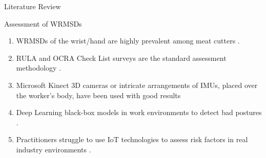 \begin{frame}{Literature Review}
    \begin{alertblock}{Assessment of WRMSDs}
    \begin{enumerate}%
    \item WRMSDs of the wrist/hand are highly prevalent among meat cutters \cite{ViikariJuntura1983}.
    \item RULA and OCRA Check List surveys are the standard assessment methodology \cite{McAtamney1993, Occhipinti1998}.
    \item Microsoft Kinect 3D cameras or intricate arrangements of IMUs, placed over the worker's body, have been used with good results \cite{Vignais2013,Buisseret2018, Chen2018}
    \item Deep Learning black-box models in work environments to detect bad postures \cite{Barkallah2017,Abobakr2017,Hu2018}.
    \item Practitioners struggle to use IoT technologies to assess risk factors in real industry environments \cite{Lim2020}.
    \end{enumerate}
    \end{alertblock}
\end{frame}






